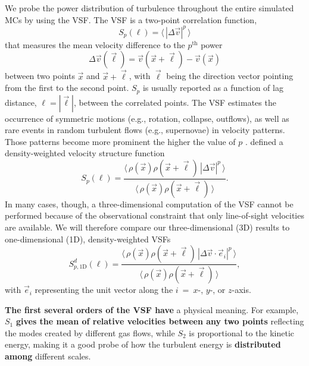 We probe the power distribution of turbulence throughout the entire simulated MCs by using the VSF.
The VSF is a two-point correlation function,
\begin{equation}
	{S}_p (\ell) = \langle \, |\Delta \vec{v}|^p  \, \rangle
    \label{equ:method:def_vsf}
\end{equation}
that measures the mean velocity difference to the $p^\mathrm{th}$ power
\begin{equation}\Delta \vec{v} (\vec{\ell}) = \vec{v}(\vec{x}+\vec{\ell}) - \vec{v}(\vec{x})
\end{equation} 
between two points $\vec{x}$ and $\vec{x}+\vec{\ell}$, with $\vec{\ell}$ being the direction vector pointing from the first to the second point.  
    $S_p$ is usually reported as a function of 
lag distance, $\ell = |\vec{\ell}|$, between the correlated points.
The VSF estimates the occurrence of symmetric motions (e.g., rotation, collapse, outflows), as well as rare events in random turbulent flows (e.g., supernovae) in velocity patterns.
Those patterns become more prominent the higher the value of $p$ \citep{Heyer2004}.
\citet{Padoan2016a} defined a density-weighted velocity structure function
\begin{equation}
	{S}_p (\ell) = \frac{\langle \, \rho(\vec{x}) \rho(\vec{x}+\vec{\ell}) \, |\Delta \vec{v}|^p  \, \rangle}{\langle  \, \rho(\vec{x}) \rho(\vec{x}+\vec{\ell}) \, \rangle}.
    \label{equ:method:def_vsf_dw}
\end{equation}
   In many cases, though, a three-dimensional computation of the VSF cannot be performed 
   because of the observational constraint that only line-of-sight velocities are available.  We 
   will therefore compare our three-dimensional (3D) results to one-dimensional (1D), 
   density-weighted VSFs
   \begin{equation}
	\mathit{S}^d_{p,\mathrm{1D}} (\ell) = \frac{\langle \, \rho(\vec{x}) \rho(\vec{x}+\vec{\ell}) \, |\Delta 
        \vec{v} \cdot \vec{e}_i|^p  \, \rangle}{\langle  \, \rho(\vec{x}) \rho(\vec{x}+\vec{\ell}) \, \rangle} ,
   \label{equ:results:def_vsf_1d}
   \end{equation}
    with $\vec{e}_i$ representing the unit vector along the $i$~=~$x$-, $y$-, or $z$-axis.

\textbf{The first several orders of the VSF have} a physical meaning. 
For example, $\mathit{S}_1$ \textbf{ gives the mean of relative velocities between any two points} reflecting the modes created by different gas flows, while $\mathit{S}_2$ is proportional to the kinetic energy, making it a good probe of how the turbulent energy is \textbf{distributed among} different scales.

